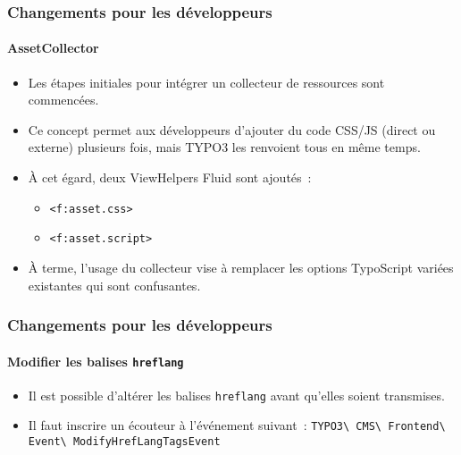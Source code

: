 
\begin{frame}[fragile]
	\frametitle{Changements pour les développeurs}
	\framesubtitle{AssetCollector}

	\begin{itemize}
		\item Les étapes initiales pour intégrer un collecteur de ressources sont commencées.
		\item Ce concept permet aux développeurs d'ajouter du code CSS/JS (direct ou externe)
			plusieurs fois, mais TYPO3 les renvoient tous en même temps.
		\item À cet égard, deux ViewHelpers Fluid sont ajoutés~:
			\begin{itemize}
				\item \texttt{<f:asset.css>}
				\item \texttt{<f:asset.script>}
			\end{itemize}
		\item À terme, l'usage du collecteur vise à remplacer les options TypoScript
			variées existantes qui sont confusantes.
	\end{itemize}

\end{frame}


\begin{frame}[fragile]
	\frametitle{Changements pour les développeurs}
	\framesubtitle{Modifier les balises \texttt{hreflang}}

	\lstset{basicstyle=\smaller\ttfamily}

	\begin{itemize}
		\item Il est possible d'altérer les balises \texttt{hreflang} avant qu'elles soient transmises.
		\item Il faut inscrire un écouteur à l'événement suivant~:\newline
			\smaller
				\texttt{TYPO3\textbackslash
					CMS\textbackslash
					Frontend\textbackslash
					Event\textbackslash
					ModifyHrefLangTagsEvent}
			\normalsize
	\end{itemize}

\end{frame}

